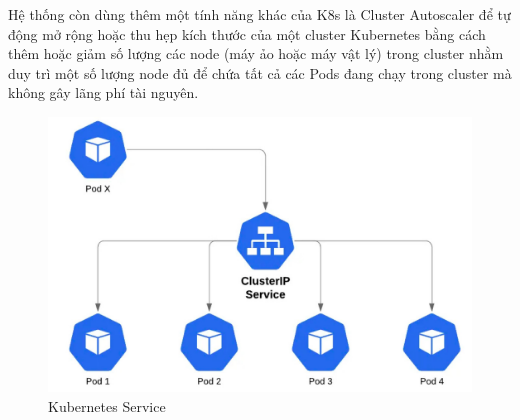\noindent Hệ thống còn dùng thêm một tính năng khác của K8s là Cluster Autoscaler để tự động mở rộng hoặc thu hẹp kích thước của một cluster Kubernetes bằng cách thêm hoặc giảm số lượng các node (máy ảo hoặc máy vật lý) trong cluster nhằm duy trì một số lượng node đủ để chứa tất cả các Pods đang chạy trong cluster mà không gây lãng phí tài nguyên.
 \begin{figure}[H]
    \begin{center}
    \includegraphics[scale = 0.25]{images/phat/service-cluster.jpg}
    \vspace*{7mm}
    \caption{Kubernetes Service}
    \end{center}
    \label{}
\end{figure}
